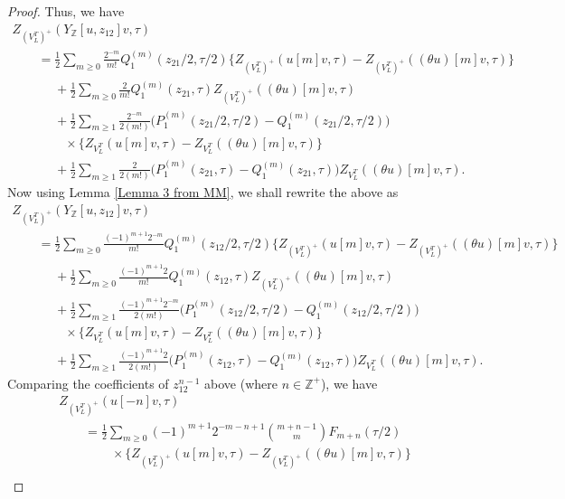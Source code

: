 \documentclass[pdftex]{sigma}
\numberwithin{equation}{section}
\theoremstyle{definition}
\begin{document}
\begin{proof}
Thus, we have
\begin{gather*}
Z_{(V_L^T)^+}(Y_{\mathbb{Z}}[u,z_{12}]v,\tau)\\
\qquad=\frac{1}{2}\sum_{m\geq 0}\frac{2^{-m}}{m!} Q_1^{(m)}(z_{21}/2,\tau/2)\{ Z_{(V_L^T)^+}(u[m]v,\tau) - Z_{(V_L^T)^+}((\theta u)[m]v,\tau)\}\\
\phantom{\qquad=}{}+\frac{1}{2}\sum_{m\geq 0}\frac{2}{m!} Q_1^{(m)}(z_{21},\tau) Z_{(V_L^T)^+}((\theta u)[m]v,\tau)\\
\phantom{\qquad=}{}+\frac{1}{2}\sum_{m\geq 1}\frac{2^{-m}}{2(m!)}\bigl( P_1^{(m)}(z_{21}/2,\tau/2)-Q_1^{(m)}(z_{21}/2,\tau/2)\bigr)\\
\phantom{\qquad=+}{}\times\{Z_{V_L^T}(u[m]v, \tau)-Z_{V_L^T}((\theta u)[m]v, \tau)\}\\
\phantom{\qquad=}{}+\frac{1}{2}\sum_{m\geq 1}\frac{2}{2(m!)}\bigl( P_1^{(m)}(z_{21},\tau)-Q_1^{(m)}(z_{21},\tau)\bigr)Z_{V_L^T}((\theta u)[m]v, \tau).\end{gather*}
Now using Lemma \ref{Lemma 3 from MM}, we shall rewrite the above as
\begin{gather*}
Z_{(V_L^T)^+}(Y_{\mathbb{Z}}[u,z_{12}]v,\tau)\\
\qquad=\frac{1}{2}\sum_{m\geq 0}\frac{(-1)^{m+1}2^{-m}}{m!} Q_1^{(m)}(z_{12}/2,\tau/2)\{ Z_{(V_L^T)^+}(u[m]v,\tau) - Z_{(V_L^T)^+}((\theta u)[m]v,\tau)\}\\
\phantom{\qquad=}{}+\frac{1}{2}\sum_{m\geq 0}\frac{(-1)^{m+1}2}{m!} Q_1^{(m)}(z_{12},\tau) Z_{(V_L^T)^+}((\theta u)[m]v,\tau)\\
\phantom{\qquad=}{}+ \frac{1}{2} \sum_{m \geq 1} \frac{(-1)^{m+1} 2^{-m}}{2(m!)} \bigl( P_1^{(m)}(z_{12}/2, \tau/2) - Q_1^{(m)}(z_{12}/2, \tau/2) \bigr)\\
\phantom{\qquad=+}{}\times \{ Z_{V_L^T}(u[m] v, \tau) - Z_{V_L^T} ( (\theta u)[m] v, \tau ) \}
\\
\phantom{\qquad=}{}+\frac{1}{2}\sum_{m\geq 1}\frac{(-1)^{m+1}2}{2(m!)}\bigl( P_1^{(m)}(z_{12},\tau)-Q_1^{(m)}(z_{12},\tau)\bigr)Z_{V_L^T}((\theta u)[m]v, \tau).
\end{gather*}
Comparing the coefficients of $z_{12}^{n-1}$ above (where $n\in \mathbb{Z}^+$), we have
\begin{gather*}
Z_{(V_L^T)^+}(u[-n]v,\tau)\\
\qquad=\frac{1}{2}\sum_{m\geq 0}(-1)^{m+1}2^{-m-n+1}\binom{m+n-1}{m}F_{m+n}(\tau/2)\\
\phantom{\qquad=+}{}\times \{ Z_{(V_L^T)^+}(u[m]v,\tau) - Z_{(V_L^T)^+}((\theta u)[m]v,\tau)\}\\

\end{gather*}
\end{proof}
\end{document}
